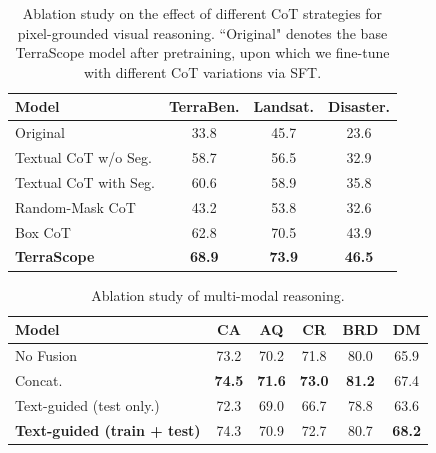 \begin{table}[!t]
    \centering
    \footnotesize
    \setlength\tabcolsep{9pt}
    \setlength{\extrarowheight}{0.01pt}
    \begin{tabular}{>{\kern-0.5\tabcolsep}l|ccc<{\kern-0.5\tabcolsep}}
            \toprule
            \textbf{Model} & \textbf{TerraBen.} & \textbf{Landsat.} & \textbf{Disaster.}  \\
            \midrule
             Original  & 33.8 & 45.7 & 23.6 \\
            Textual CoT w/o Seg.  & 58.7 & 56.5 & 32.9 \\
            Textual CoT with Seg.   & 60.6 & 58.9 & 35.8 \\
            Random-Mask CoT  & 43.2 & 53.8 & 32.6 \\
            Box CoT  & 62.8 & 70.5 & 43.9 \\
            \midrule
            \rowcolor{ModelGreen}\textbf{TerraScope}  & \textbf{68.9} & \textbf{73.9} & \textbf{46.5}  \\
            \bottomrule
    \end{tabular}
    \vspace{-6pt}
    \caption{Ablation study on the effect of different CoT strategies for pixel-grounded visual reasoning. ``Original" denotes the base TerraScope model after pretraining, upon which we fine-tune with different CoT variations via SFT.}
    \vspace{-5mm}
    \label{tab:pgr}
\end{table}
\begin{table}[!t]
    \centering
    \footnotesize
    \setlength\tabcolsep{7pt}
    \setlength{\extrarowheight}{0.01pt}
    \begin{tabular}{>{\kern-0.5\tabcolsep}l|ccccc<{\kern-0.5\tabcolsep}}
        \toprule
        \textbf{Model} & \textbf{CA} & \textbf{AQ} & \textbf{CR} & \textbf{BRD} & \textbf{DM} \\
        \midrule
        No Fusion & 73.2 & 70.2 & 71.8 & 80.0 & 65.9 \\
        Concat. & \textbf{74.5} & \textbf{71.6} & \textbf{73.0} & \textbf{81.2} & 67.4 \\
        Text-guided (test only.) & 72.3 & 69.0 & 66.7 & 78.8 & 63.6 \\
        \rowcolor{ModelGreen}\textbf{Text-guided (train + test)} & 74.3 & 70.9 & 72.7 & 80.7 & \textbf{68.2} \\
        \bottomrule
    \end{tabular}
    \vspace{-6pt}
    \caption{Ablation study of multi-modal reasoning.}
    \label{tab:multimodal}
\end{table}

